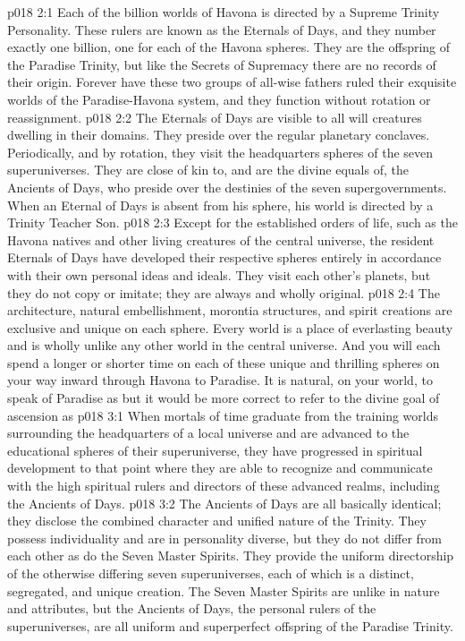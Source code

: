 \vs p018 2:1 Each of the billion worlds of Havona is directed by a Supreme Trinity Personality. These rulers are known as the Eternals of Days, and they number exactly one billion, one for each of the Havona spheres. They are the offspring of the Paradise Trinity, but like the Secrets of Supremacy there are no records of their origin. Forever have these two groups of all\hyp{}wise fathers ruled their exquisite worlds of the Paradise\hyp{}Havona system, and they function without rotation or reassignment.
\vs p018 2:2 The Eternals of Days are visible to all will creatures dwelling in their domains. They preside over the regular planetary conclaves. Periodically, and by rotation, they visit the headquarters spheres of the seven superuniverses. They are close of kin to, and are the divine equals of, the Ancients of Days, who preside over the destinies of the seven supergovernments. When an Eternal of Days is absent from his sphere, his world is directed by a Trinity Teacher Son.
\vs p018 2:3 Except for the established orders of life, such as the Havona natives and other living creatures of the central universe, the resident Eternals of Days have developed their respective spheres entirely in accordance with their own personal ideas and ideals. They visit each other’s planets, but they do not copy or imitate; they are always and wholly original.
\vs p018 2:4 The architecture, natural embellishment, morontia structures, and spirit creations are exclusive and unique on each sphere. Every world is a place of everlasting beauty and is wholly unlike any other world in the central universe. And you will each spend a longer or shorter time on each of these unique and thrilling spheres on your way inward through Havona to Paradise. It is natural, on your world, to speak of Paradise as  but it would be more correct to refer to the divine goal of ascension as 
\vs p018 3:1 When mortals of time graduate from the training worlds surrounding the headquarters of a local universe and are advanced to the educational spheres of their superuniverse, they have progressed in spiritual development to that point where they are able to recognize and communicate with the high spiritual rulers and directors of these advanced realms, including the Ancients of Days.
\vs p018 3:2 The Ancients of Days are all basically identical; they disclose the combined character and unified nature of the Trinity. They possess individuality and are in personality diverse, but they do not differ from each other as do the Seven Master Spirits. They provide the uniform directorship of the otherwise differing seven superuniverses, each of which is a distinct, segregated, and unique creation. The Seven Master Spirits are unlike in nature and attributes, but the Ancients of Days, the personal rulers of the superuniverses, are all uniform and superperfect offspring of the Paradise Trinity.

